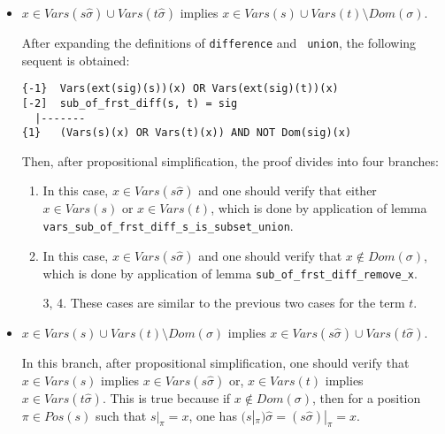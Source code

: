 \documentclass[submission,copyright,creativecommons]{eptcs}
\begin{document}
  \begin{itemize}

  \item $x \in Vars(s\hat{\sigma}) \cup Vars(t\hat{\sigma})$ implies
    $x \in Vars(s) \cup Vars(t) \setminus Dom(\sigma)$.

    After expanding the definitions of {\tt difference} and {\tt
      union}, the following sequent is obtained:

    {\small
\begin{verbatim}
{-1}  Vars(ext(sig)(s))(x) OR Vars(ext(sig)(t))(x)
[-2]  sub_of_frst_diff(s, t) = sig
  |-------
{1}   (Vars(s)(x) OR Vars(t)(x)) AND NOT Dom(sig)(x)
\end{verbatim}
    }

    Then, after propositional simplification, the proof divides into
    four branches:

    \begin{enumerate}

    \item In this case, $x \in Vars(s\hat{\sigma})$ and one should
      verify that either $x \in Vars(s)$ or $x \in Vars(t)$, which is
      done by application of lemma {\tt
        vars\_\-sub\_\-of\_\-frst\_\-diff\_s\_\-is\_\-subset\_\-union}.

    \item In this case, $x \in Vars(s\hat{\sigma})$ and one should
      verify that $x \notin Dom(\sigma)$, which is done by application
      of lemma {\tt sub\_of\_frst\_diff\_remove\_x}.

    \item[3, 4.] These cases are similar to the previous two cases for
      the term $t$.

    \end{enumerate}

  \item $x \in Vars(s) \cup Vars(t) \setminus Dom(\sigma)$ implies $x
    \in Vars(s\hat{\sigma}) \cup Vars(t\hat{\sigma})$.

    In this branch, after propositional simplification, one should
    verify that $x \in Vars(s)$ implies $x \in Vars(s\hat{\sigma})$
    or, $x \in Vars(t)$ implies $x \in Vars(t\hat{\sigma})$. This is
    true because if $x \notin Dom(\sigma)$, then for a position $\pi
    \in Pos(s)$ such that $s|_{\pi} = x$, one has
    $(s|_{\pi})\hat{\sigma} = (s\hat{\sigma})|_{\pi} = x$.

  \end{itemize}
\end{document}
